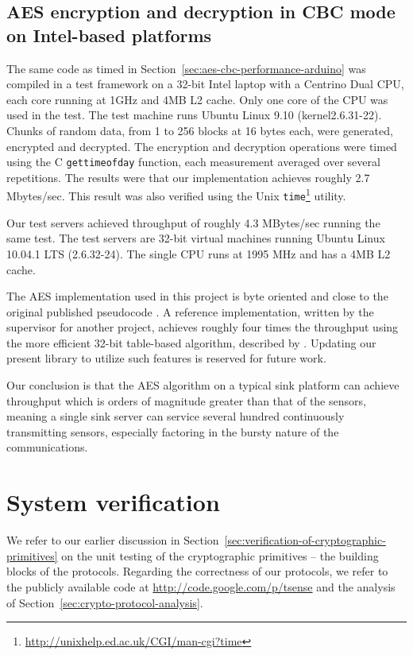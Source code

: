 \subsection{AES encryption and decryption in CBC mode on Intel-based platforms}

The same code as timed in Section~\ref{sec:aes-cbc-performance-arduino} was compiled in a test framework on a 32-bit Intel laptop with a Centrino Dual CPU, each core running at 1GHz and 4MB L2 cache. Only one core of the CPU was used in the test. The test machine runs Ubuntu Linux 9.10 (kernel2.6.31-22). Chunks of random data, from 1 to 256 blocks at 16 bytes each, were generated, encrypted and decrypted. The encryption and decryption operations were timed using the C \texttt{gettimeofday} function, each measurement averaged over several repetitions. The results were that our implementation achieves roughly 2.7 Mbytes/sec. This result was also verified using the Unix \texttt{time}\footnote{\url{http://unixhelp.ed.ac.uk/CGI/man-cgi?time}} utility.

Our test servers achieved throughput of roughly 4.3 MBytes/sec running the same test. The test servers are 32-bit virtual machines running Ubuntu Linux 10.04.1 LTS (2.6.32-24). The single CPU runs at 1995 MHz and has a 4MB L2 cache.

The AES implementation used in this project is byte oriented and close to the original published pseudocode . A reference implementation, written by the supervisor for another project, achieves roughly four times the throughput using the more efficient 32-bit table-based algorithm, described by . Updating our present library to utilize such features is reserved for future work.

Our conclusion is that the AES algorithm on a typical sink platform can achieve throughput which is orders of magnitude greater than that of the sensors, meaning a single sink server can service several hundred continuously transmitting sensors, especially factoring in the bursty nature of the communications.

\section{System verification}

We refer to our earlier discussion in Section~\ref{sec:verification-of-cryptographic-primitives} on the unit testing of the cryptographic primitives -- the building blocks of the protocols. Regarding the correctness of our protocols, we refer to the publicly available code at \url{http://code.google.com/p/tsense} and the analysis of Section~\ref{sec:crypto-protocol-analysis}.

